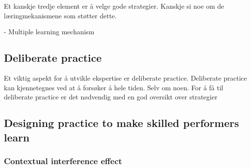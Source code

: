\documentclass[letterpaper,10pt]{article}
\begin{document}
Et kanskje tredje element er å velge gode strategier. Kanskje si noe om de læringmekanismene som støtter dette. 


- Multiple learning mechanism

\subsection{Deliberate practice}
Et viktig aspekt for å utvikle ekspertise er deliberate practice. Deliberate practice kan kjennetegnes ved at å forsøker å hele tiden. Selv om noen. For å få til deliberate practice er det nødvendig med en god oversikt over strategier 





\subsection{Designing practice to make skilled performers learn}


\subsubsection{Contextual interference effect}



\end{document}

